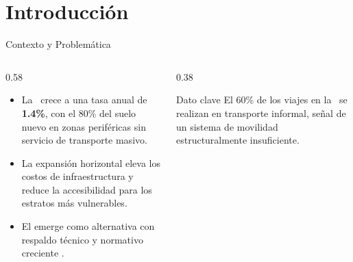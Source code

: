 
\section{Introducción}

\begin{frame}{Contexto y Problemática}
  \begin{columns}[T]
    \begin{column}{0.58\textwidth}
      \begin{itemize}
        \item La \zmvm\ crece a una tasa anual de \textbf{1.4\%}, con el 80\% del suelo
              nuevo en zonas periféricas sin servicio de transporte masivo.
        \item La expansión horizontal eleva los \alert{costos de infraestructura}
              y reduce la accesibilidad para los estratos más vulnerables.
        \item El  emerge como alternativa
              con respaldo técnico y normativo creciente \citep{lore2024densidad}.
      \end{itemize}
    \end{column}
    \begin{column}{0.38\textwidth}
      \begin{block}{Dato clave}
        El 60\% de los viajes en la \zmvm\ se realizan en transporte informal,
        señal de un sistema de movilidad estructuralmente insuficiente.
      \end{block}
    \end{column}
  \end{columns}
\end{frame}

